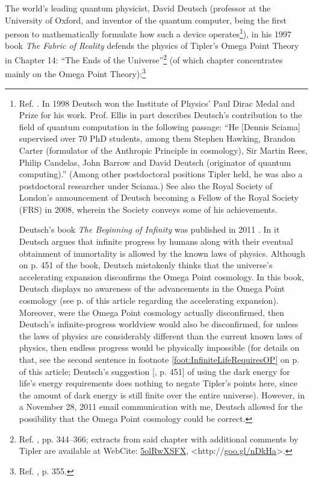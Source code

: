 \documentclass[letterpaper,12pt]{article}
\newcommand{\dsc}{\discretionary{}{}{}}
\begin{document}
The world's leading quantum physicist, David Deutsch (professor at the University of Oxford, and inventor of the quantum computer, being the first person to mathematically formulate how such a device operates\footnote{Ref. . In 1998 Deutsch won the Institute of Physics' Paul Dirac Medal and Prize for his work. Prof. Ellis \cite{Ellis2000} in part describes Deutsch's contribution to the field of quantum computation in the following passage: ``He [Dennis Sciama] supervised over 70 PhD students, among them Stephen Hawking, Brandon Carter (formulator of the Anthropic Principle in cosmology), Sir Martin Rees, Philip Candelas, John Barrow and David Deutsch (originator of quantum computing).'' (Among other postdoctoral positions Tipler held, he was also a postdoctoral researcher under Sciama.) See also the Royal Society of London's announcement \cite{RoyalSociety2008} of Deutsch becoming a Fellow of the Royal Society (FRS) in 2008, wherein the Society conveys some of his achievements.\par
    Deutsch's book \emph{The Beginning of Infinity} was published in 2011 \cite{Deutsch2011}. In it Deutsch argues that infinite progress by humans along with their eventual obtainment of immortality is allowed by the known laws of physics. Although on p. 451 of the book, Deutsch mistakenly thinks that the universe's accelerating expansion disconfirms the Omega Point cosmology. In this book, Deutsch displays no awareness of the advancements in the Omega Point cosmology (see p. \pageref{UniverseAcceleration} of this article regarding the accelerating expansion). Moreover, were the Omega Point cosmology actually disconfirmed, then Deutsch's infinite-progress worldview would also be disconfirmed, for unless the laws of physics are considerably different than the current known laws of physics, then endless progress would be physically impossible (for details on that, see the second sentence in footnote \ref{foot:InfiniteLifeRequiresOP} on p. \pageref{foot:InfiniteLifeRequiresOP} of this article; Deutsch's suggestion [, p. 451] of using the dark energy for life's energy requirements does nothing to negate Tipler's points here, since the amount of dark energy is still finite over the entire universe). However, in a November 28, 2011 email communication with me, Deutsch allowed for the possibility that the Omega Point cosmology could be correct.}), in his 1997 book \emph{The Fabric of Reality} defends the physics of Tipler's Omega Point Theory in Chapter 14: ``The Ends of the Universe''\footnote{Ref. , pp. 344--366; extracts from said chapter with additional comments by Tipler are available at WebCite: \href{http://www.webcitation.org/5olRwXSFX}{5olRwXSFX}, \textless http://\dsc \href{http://goo.gl/nDkHa}{goo.gl/\dsc nDkHa}\textgreater.} (of which chapter concentrates mainly on the Omega Point Theory):\footnote{Ref. , p. 355.}
\end{document}
